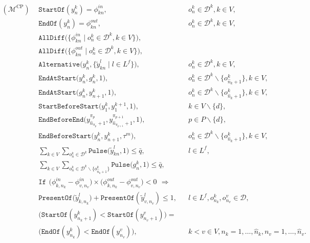 \documentclass[12pt]{article}
\newcounter{RMPone}
\begin{document}
\begin{subequations}\label{CPModel}
\begin{align}
  \label{cp-con1}(\mathcal{M}^{\text{CP}})\,\ &\texttt{StartOf}(y^k_n)=\phi^{in}_{kn}, &&o^k_n \in \mathcal{D}^{k}, k\in V, \\
        \label{cp-con2}&\texttt{EndOf}(y^k_n)=\phi^{out}_{kn}, &&o^k_n \in \mathcal{D}^{k}, k\in V, \\
        \label{cp-con3}&\texttt{AllDiff}\big( \{\phi^{in}_{kn}\mid o^k_n \in \mathcal{D}^{k}, k\in V \} \big), \\
        \label{cp-con4}&\texttt{AllDiff}\big( \{ \phi^{out}_{kn}\mid o^k_n \in \mathcal{D}^{k}, k\in V \} \big), \\
        \label{cp-con5}&\texttt{Alternative}\big(y^k_n, \{\widetilde{y}^l_{kn}\mid l\in L^f  \} \big), &&o^k_n \in \mathcal{D}^{k}, k\in V, \\
        \label{cp-con6}&\texttt{EndAtStart}\big(y^k_n, g^k_n, 1 \big), &&o^k_n \in \mathcal{D}^k \backslash \{o^k_{\widehat{n}_k+1}\}, k\in V, \\
        \label{cp-con7}&\texttt{EndAtStart}\big(g^k_n, y^k_{n+1}, 1 \big), &&o^k_n \in \mathcal{D}^k \backslash \{o^k_{\widehat{n}_k+1}\}, k\in V,\\
        \label{cp-con8}&\texttt{StartBeforeStart}\big(y^k_1, y^{k+1}_1,1 \big), &&k\in V\backslash \{d\}, \\
        \label{cp-con9}&\texttt{EndBeforeEnd}\big(y^{\pi_p}_{\widehat{n}_{\pi_p}+1}, y^{\pi_{p+1}}_{\widehat{n}_{\pi_{p+1}}+1}, 1 \big), &&p\in P\backslash \{d\}, \\
        \label{cp-con10}&\texttt{EndBeforeStart}\big( y^k_n,y^k_{n+1}, \tau^m \big), &&o^k_n \in \mathcal{D}^k \backslash \{o^k_{\widehat{n}_k+1}\}, k\in V, \\
        \label{cp-con11}&\sum_{k\in V}{\sum_{o^k_n \in \mathcal{D}^k}{ \texttt{Pulse}\big(\widetilde{y}^l_{kn}, 1 \big)}}\leqslant \bar{q}, &&l\in L^f, \\
        \label{cp-con12}&\sum_{k\in V}{\sum_{o^k_n \in \mathcal{D}^k \backslash \{o^k_{\widehat{n}_k+1}\}}{\texttt{Pulse}\big(g^k_n, 1 \big)}}\leqslant \bar{q}, \\
        &\texttt{If} \,\ \big(\phi^{in}_{k,n_k} - \phi^{in}_{v,n_v} \big) \times \big(\phi^{out}_{k,n_k} - \phi^{out}_{v,n_v} \big)<0 \,\ \Longrightarrow \nonumber \\%
        \label{cp-con13}&\texttt{PresentOf}\big(\widetilde{y}^{l}_{k,n_k} \big) + \texttt{PresentOf}(\widetilde{y}^{l}_{v,n_v}) \leqslant 1, &&l\in L^f, o^k_{n_k}, o^v_{n_v} \in \mathcal{D}, \\
        \label{cp-con14}&\big(\texttt{StartOf}(y^k_{n_k+1}) < \texttt{StartOf}(y^v_{n_v+1}) \big)= \nonumber \\%
        &\big(\texttt{EndOf}(y^k_{n_k}) < \texttt{EndOf}(y^v_{n_v}) \big), &&k<v\in V, n_k=1,\dots,\widehat{n}_k, n_v=1,\dots,\widehat{n}_v.
\end{align}
\end{subequations}
\end{document}
